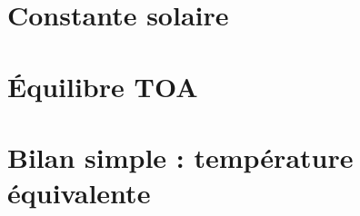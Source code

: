 \documentclass[a4paper,DIV16,10pt]{scrartcl}
\begin{document}
 \inidoc

%
%
%
%
%
%
%
%
%
%
%
\newpage
\section{Constante solaire}


%
%

\newpage
\section{\'Equilibre TOA}


\newpage
\section{Bilan simple : température équivalente}


\end{document}
